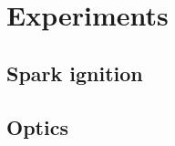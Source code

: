 \chapter{Experiments}

    

    \section*{Spark ignition}

    \section{Optics} \label{sec:design_optics}
